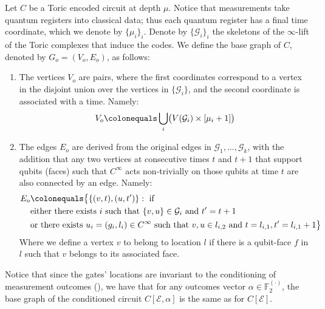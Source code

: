   \begin{definition}
    Let $C$ be a Toric encoded circuit at depth $\mu$. Notice that measurements take quantum registers into classical data; thus each quantum register has a final time coordinate, which we denote by $\{\mu_i\}_i$. Denote by $\{\mathcal{G}_{i}\}_i$ the skeletons of the $\infty$-lift of the Toric complexes that induce the codes. We define the base graph of $C$, denoted by $G_{o} = (V_{o}, E_{o})$, as follows:
    \begin{enumerate}
      \item The vertices $V_{o}$ are pairs, where the first coordinates correspond to a vertex in the disjoint union over the vertices in $\{\mathcal{G}_{i}\}$, and the second coordinate is associated with a time. Namely:
        \begin{equation*}
          \begin{split}
            V_{o} \colonequals \bigcup_{i} \bigl( V(\mathcal{G}_{i}) \times [\mu_{i}+1] \bigr)
          \end{split}
        \end{equation*}
      \item The edges $E_{o}$ are derived from the original edges in $\mathcal{G}_{1}, \ldots, \mathcal{G}_{k}$, with the addition that any two vertices at consecutive times $t$ and $t+1$ that support qubits (faces) such that $C^{\infty}$ acts non-trivially on those qubits at time $t$ are also connected by an edge. Namely:
        \begin{equation*}
          \begin{split}
            E_{o} & \colonequals \big\{ \{(v,t), (u,t^{\prime}) \} :  \text{ if }     \\ 
              & \text{either there exists } i \text{ such that }  \{v,u\} \in \mathcal{G}_{i} \text{ and } t^{\prime} = t+1 \\
            & \text{or there exists } u_i = (g_{i},l_{i}) \in C^{\infty} \text{ such  that }  v,u \in l_{i,2} \text{ and } t = l_{i,1}, t^{\prime} = l_{i,1}+1  \big\} 
          \end{split}
        \end{equation*}
        Where we define a vertex $v$ to belong to location $l$ if there is a qubit-face $f$ in $l$ such that $v$ belongs to its associated face. %
    \end{enumerate} 
  \end{definition}
Notice that since the gates' locations are invariant to the conditioning of measurement outcomes (), we have that for any outcomes vector $\alpha \in \mathbb{F}_{2}^{(\cdot)}$, the base graph of the conditioned circuit $C[\mathcal{E},\alpha]$ is the same as for $C[\mathcal{E}]$.

